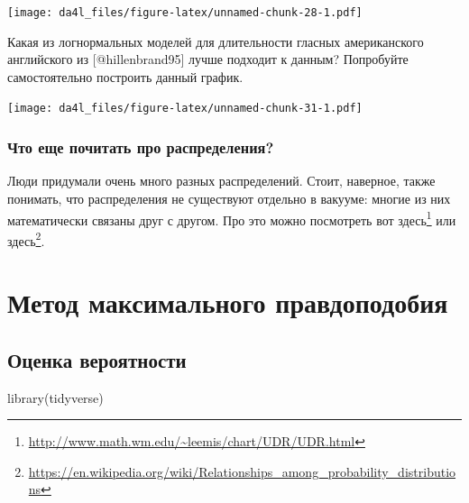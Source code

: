 \documentclass[
]{book}
\makeatletter
\newenvironment{Shaded}{\begin{snugshade}}{\end{snugshade}}
\newcommand{\FunctionTok}[1]{\textcolor[rgb]{0.00,0.00,0.00}{#1}}
\newcommand{\NormalTok}[1]{#1}
\renewcommand{\href}[2]{#2\footnote{\url{#1}}}
\newenvironment{kframe}{%
    \medskip{}
    \setlength{\fboxsep}{.8em}
    \def\at@end@of@kframe{}%
    \ifinner\ifhmode%
    \def\at@end@of@kframe{\end{minipage}}%
    \begin{minipage}{\columnwidth}%
    \fi\fi%
    \def\FrameCommand##1{\hskip\@totalleftmargin \hskip-\fboxsep
    \colorbox{shadecolor}{##1}\hskip-\fboxsep
        \hskip-\linewidth \hskip-\@totalleftmargin \hskip\columnwidth}%
    \MakeFramed {\advance\hsize-\width
      \@totalleftmargin\z@ \linewidth\hsize
      \@setminipage}}%
  {\par\unskip\endMakeFramed%
    \at@end@of@kframe}
\newenvironment{rmdblock}[1]
  {
    \begin{itemize}
    \renewcommand{\labelitemi}{
      \raisebox{-.7\height}[0pt][0pt]{
        {\setkeys{Gin}{width=3em,keepaspectratio}\texttt{[image: images/\#1]}}
        }
        }
        \setlength{\fboxsep}{1em}
        \begin{kframe}
        \item
      }
      {
        \end{kframe}
        \end{itemize}
      }
\newenvironment{rmdtask}
      {\begin{rmdblock}{task}}
      {\end{rmdblock}}
\makeatother
\begin{document}
\texttt{[image: da4l\_files/figure-latex/unnamed-chunk-28-1.pdf]}

\begin{rmdtask}
Какая из логнормальных моделей для длительности гласных американского
английского из {[}@hillenbrand95{]} лучше подходит к данным? Попробуйте
самостоятельно построить данный график.
\end{rmdtask}

\texttt{[image: da4l\_files/figure-latex/unnamed-chunk-31-1.pdf]}

\hypertarget{ux447ux442ux43e-ux435ux449ux435-ux43fux43eux447ux438ux442ux430ux442ux44c-ux43fux440ux43e-ux440ux430ux441ux43fux440ux435ux434ux435ux43bux435ux43dux438ux44f}{%
\subsection{Что еще почитать про распределения?}\label{ux447ux442ux43e-ux435ux449ux435-ux43fux43eux447ux438ux442ux430ux442ux44c-ux43fux440ux43e-ux440ux430ux441ux43fux440ux435ux434ux435ux43bux435ux43dux438ux44f}}

Люди придумали очень много разных распределений. Стоит, наверное, также понимать, что распределения не существуют отдельно в вакууме: многие из них математически связаны друг с другом. Про это можно посмотреть \href{http://www.math.wm.edu/~leemis/chart/UDR/UDR.html}{вот здесь} или \href{https://en.wikipedia.org/wiki/Relationships_among_probability_distributions}{здесь}.

\hypertarget{ux43cux435ux442ux43eux434-ux43cux430ux43aux441ux438ux43cux430ux43bux44cux43dux43eux433ux43e-ux43fux440ux430ux432ux434ux43eux43fux43eux434ux43eux431ux438ux44f}{%
\chapter{Метод максимального правдоподобия}\label{ux43cux435ux442ux43eux434-ux43cux430ux43aux441ux438ux43cux430ux43bux44cux43dux43eux433ux43e-ux43fux440ux430ux432ux434ux43eux43fux43eux434ux43eux431ux438ux44f}}

\hypertarget{ux43eux446ux435ux43dux43aux430-ux432ux435ux440ux43eux44fux442ux43dux43eux441ux442ux438}{%
\section{Оценка вероятности}\label{ux43eux446ux435ux43dux43aux430-ux432ux435ux440ux43eux44fux442ux43dux43eux441ux442ux438}}

\begin{Shaded}
\begin{Highlighting}[]
\FunctionTok{library}\NormalTok{(tidyverse)}
\end{Highlighting}
\end{Shaded}
\end{document}
